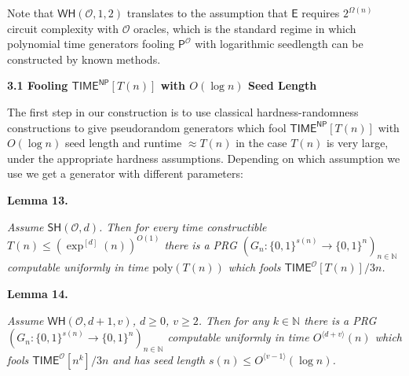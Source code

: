 \documentclass[10pt,a4paper]{article}
\begin{document}



Note that $\mathsf{WH}(\mathcal{O},1,2)$ translates to the assumption that $\mathsf{E}$ requires $2^{\Omega(n)}$ circuit complexity with $\mathcal{O}$ oracles, which is the standard regime in which polynomial time generators fooling $\mathsf{P}^{\mathcal{O}}$ with logarithmic seedlength can be constructed by known methods.\par




\par\medskip\noindent\textbf{
3.1 Fooling ${\mathsf{TIME}}^{{\mathsf{NP}}}[T(n)]$ with $O(\log n)$ Seed Length}\par




The first step in our construction is to use classical hardness-randomness constructions to give pseudorandom generators which fool ${\mathsf{TIME}}^{{\mathsf{NP}}}[T(n)]$ with $O(\log n)$ seed length and runtime $\approx T(n)$ in the case $T(n)$ is very large, under the appropriate hardness assumptions. Depending on which assumption we use we get a generator with different parameters:\par





\par\medskip\noindent\textbf{
\textbf{Lemma 13}\textbf{.}
}\par



\emph{Assume $\mathsf{SH}(\mathcal{O},d)$. Then for every time constructible $T(n)\leq(\exp^{[d]}(n))^{O(1)}$ there is a PRG $(G_{n}:\{0,1\}^{s(n)}\to\{0,1\}^{n})_{n\in\mathbb{N}}$ computable uniformly in time $\mathrm{poly}(T(n))$ which fools ${\mathsf{TIME}}^{\mathcal{O}}[T(n)]/3n$.}\par







\par\medskip\noindent\textbf{
\textbf{Lemma 14}\textbf{.}
}\par



\emph{Assume $\mathsf{WH}(\mathcal{O},d+1,v)$, $d\geq 0$, $v\geq 2$. Then for any $k\in\mathbb{N}$ there is a PRG $(G_{n}:\{0,1\}^{s(n)}\to\{0,1\}^{n})_{n\in\mathbb{N}}$ computable uniformly in time $O^{\langle d+v\rangle}(n)$ which fools ${\mathsf{TIME}}^{\mathcal{O}}[n^{k}]/3n$ and has seed length $s(n)\leq O^{\langle v-1\rangle}(\log n)$.}\par
\end{document}
